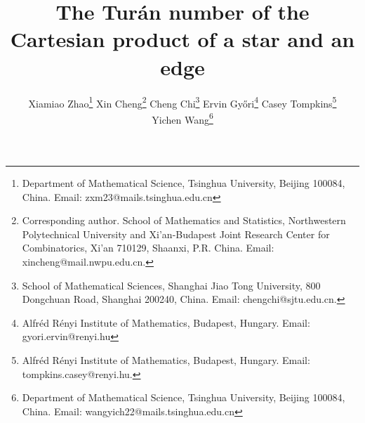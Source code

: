 \documentclass[11pt,a4paper]{article}
\theoremstyle{definition}
\begin{document}
    \title{The Tur\'{a}n number of the Cartesian product of a star and an edge
    }
    \author{
    Xiamiao Zhao\thanks{Department of Mathematical Science, Tsinghua University, Beijing 100084, China. Email: zxm23@mails.tsinghua.edu.cn} \qquad
    Xin Cheng\thanks{Corresponding author. School of Mathematics and Statistics, Northwestern Polytechnical University and Xi'an-Budapest Joint Research Center for Combinatorics, Xi'an 710129, Shaanxi, P.R. China. Email: xincheng@mail.nwpu.edu.cn.} \qquad
    Cheng Chi\thanks{School of Mathematical Sciences, Shanghai Jiao Tong University, 800 Dongchuan Road, Shanghai 200240, China. Email: chengchi@sjtu.edu.cn.} \qquad
    Ervin Gy\H{o}ri\thanks{Alfr\'{e}d R\'{e}nyi Institute of Mathematics, Budapest, Hungary. Email: gyori.ervin@renyi.hu} \qquad
    Casey Tompkins\thanks{Alfr\'{e}d R\'{e}nyi Institute of Mathematics, Budapest, Hungary. Email: tompkins.casey@renyi.hu.} \\
    Yichen Wang\thanks{Department of Mathematical Science, Tsinghua University, Beijing 100084, China. Email: wangyich22@mails.tsinghua.edu.cn}}
    \date{}
    \maketitle
\end{document}
